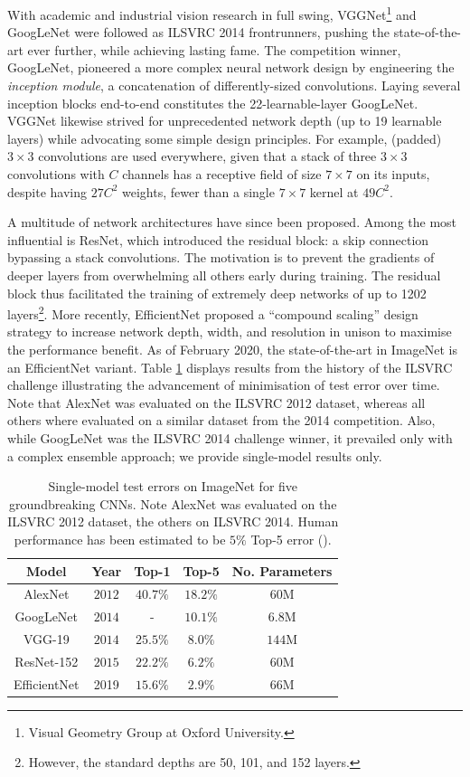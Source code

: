 With academic and industrial vision research in full swing, VGGNet\footnote{Visual Geometry Group at Oxford University.} and GoogLeNet were followed as ILSVRC 2014 frontrunners, pushing the state-of-the-art ever further, while achieving lasting fame. The competition winner, GoogLeNet, pioneered a more complex neural network design by engineering the \emph{inception module}, a concatenation of differently-sized convolutions. Laying several inception blocks end-to-end constitutes the 22-learnable-layer GoogLeNet. VGGNet likewise strived for unprecedented network depth (up to 19 learnable layers) while advocating some simple design principles. For example, (padded) $3\times 3$ convolutions are used everywhere, given that a stack of three $3 \times 3$ convolutions with $C$ channels has a receptive field of size $7 \times 7$ on its inputs, despite having $27C^2$ weights, fewer than a single $7 \times 7$ kernel at $49C^2$.

A multitude of network architectures have since been proposed. Among the most influential is ResNet, which introduced the residual block: a skip connection bypassing a stack convolutions. The motivation is to prevent the gradients of deeper layers from overwhelming all others early during training. The residual block thus facilitated the training of extremely deep networks of up to 1202 layers\footnote{However, the standard depths are 50, 101, and 152 layers.}. More recently, EfficientNet proposed a ``compound scaling'' design strategy to increase network depth, width, and resolution in unison to maximise the performance benefit. As of February 2020, the state-of-the-art in ImageNet is an EfficientNet variant. Table \ref{table:convnets} displays results from the history of the ILSVRC challenge illustrating the advancement of minimisation of test error over time. Note that AlexNet was evaluated on the ILSVRC 2012 dataset, whereas all others where evaluated on a similar dataset from the 2014 competition. Also, while GoogLeNet was the ILSVRC 2014 challenge winner, it prevailed only with a complex ensemble approach; we provide single-model results only. 

\begin{table}
\centering
\begin{tabular}{ |c|c|c|c|c| } 
\hline
 Model & Year &  Top-1 & Top-5 & No. Parameters \\ 
 \hline
 AlexNet & $2012$ & $40.7\%$ & $18.2\%$ & $60$M \\
 GoogLeNet & $2014$ & - & $10.1\%$ & $6.8$M\\
 VGG-19 & $2014$ & $25.5\%$ & $8.0\%$ & $144$M \\
 ResNet-152 & $2015$ & $22.2\%$ & $6.2\%$ & $60$M \\
 EfficientNet & 2019 & $15.6\%$ & $2.9\%$ & $66$M \\
 \hline
\end{tabular}
\caption{Single-model test errors on ImageNet for five groundbreaking CNNs. Note AlexNet was evaluated on the ILSVRC 2012 dataset, the others on ILSVRC 2014. Human performance has been estimated to be $5\%$ Top-5 error (\cite{karpathy2014learned}).}
\label{table:convnets}
\end{table}

